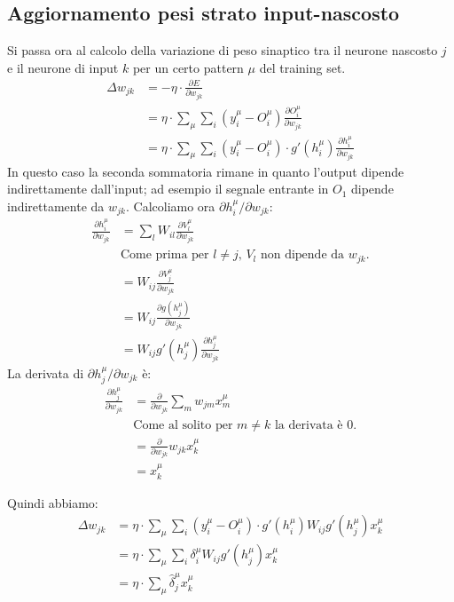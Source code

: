 	\subsection{Aggiornamento pesi strato input-nascosto} %
	\label{sub:aggiornamento_pesi_strato_input_nascosto}
	Si passa ora al calcolo della variazione di peso sinaptico tra il neurone nascosto $j$ e il neurone di input $k$ per un certo pattern $\mu$ del training set.
	\begin{align*}
		\Delta w_{jk} &= - \eta \cdot \frac{\partial E}{\partial w_{jk}} \\
		&= \eta \cdot \sum_\mu \sum_i (y^\mu_i - O^\mu_i)  \frac{\partial O^\mu_i}{\partial w_{jk}} \\
		&= \eta \cdot \sum_\mu \sum_i (y^\mu_i - O^\mu_i) \cdot   g'(h^\mu_i) \frac{\partial h^\mu_i}{\partial w_{jk}}
	\end{align*}
	In questo caso la seconda sommatoria rimane in quanto l'output dipende indirettamente dall'input; ad esempio il segnale entrante in $O_1$ dipende indirettamente da $w_{jk}$.
	Calcoliamo ora $\partial h^\mu_i / \partial w_{jk}$:
	\begin{align*}
		\frac{\partial h^\mu_i}{\partial w_{jk}} &= \sum_l W_{il} \frac{\partial V_l^\mu}{\partial w_{jk}} \\
		&\text{Come prima per $l\neq j$, $V_l$ non dipende da $w_{jk}$.} \\
		&= W_{ij} \frac{\partial V_j^\mu}{\partial w_{jk}} \\
		&= W_{ij} \frac{\partial g(h^\mu_j)}{\partial w_{jk}} \\
		&= W_{ij} g'(h^\mu_j) \frac{\partial h^\mu_j}{\partial w_{jk}}
	\end{align*}
	La derivata di $\partial h^\mu_j / \partial w_{jk}$ è:
	\begin{align*}
		\frac{\partial h^\mu_j}{\partial w_{jk}} 
		&= \frac{\partial}{\partial w_{jk}} \sum_m w_{jm} x^\mu_m \\
		&\text{Come al solito per $m \neq k$ la derivata è 0.} \\
		&= \frac{\partial}{\partial w_{jk}} w_{jk} x^\mu_k\\
		&= x^\mu_k
	\end{align*}

	\newpage

	Quindi abbiamo:
	\begin{align*}
		\Delta w_{jk} &= \eta \cdot \sum_\mu \sum_i (y_i^\mu - O^\mu_i) \cdot g'(h^\mu_i) W_{ij} g'(h_j^\mu) x^\mu_k\\
		&= \eta \cdot \sum_\mu \sum_i \delta_i^\mu W_{ij} g'(h_j^\mu) x^\mu_k \\
		&= \eta \cdot \sum_\mu \hat{\delta}_j^\mu x^\mu_k
	\end{align*}

